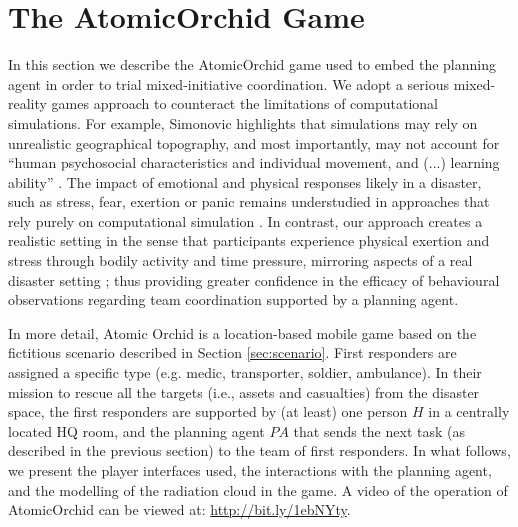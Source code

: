 \section{The A\lowercase{tomic}O\lowercase{rchid} Game}\label{sec:atomicorchid}
\noindent In this section we describe the AtomicOrchid game used to embed the planning agent in order to trial mixed-initiative coordination.
We adopt a serious mixed-reality games approach to counteract the limitations of computational simulations. For example, Simonovic highlights that simulations may rely on unrealistic geographical topography, and most importantly, may not account for ``human psychosocial characteristics and individual movement, and (...) learning ability'' \cite{simonovic:2009}. The impact of emotional and physical responses likely in a disaster, such as stress, fear, exertion or panic remains understudied in approaches that rely purely on computational simulation \cite{drury:etal:2009}. In contrast, our approach creates a realistic setting in the sense that participants experience physical exertion and stress through bodily activity and time pressure, mirroring aspects of a real disaster setting \cite{paho:2001}; thus providing greater confidence in the efficacy of behavioural observations regarding team coordination supported by a planning agent.

In more detail, Atomic Orchid is a location-based mobile game based on the fictitious scenario described in Section \ref{sec:scenario}. First responders are assigned a specific type (e.g. medic, transporter, soldier, ambulance). In their mission to rescue all the targets (i.e., assets and casualties) from the disaster space, the first responders are supported by (at least) one person $H$ in a centrally located HQ room, and the planning agent $PA$ that sends the next task (as described in the previous section) to the team of first responders. In what follows, we present the player interfaces used, the interactions with the planning agent, and the modelling of the radiation cloud in the game. A video of the operation of AtomicOrchid can be viewed at: \url{http://bit.ly/1ebNYty}.





 